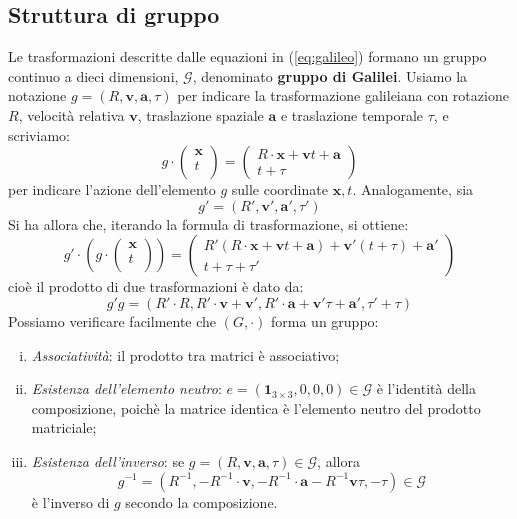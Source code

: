 \documentclass[a4paper,11pt]{book}
\theoremstyle{plain}
\theoremstyle{definition}
\begin{document}
\subsection{Struttura di gruppo}
 Le trasformazioni descritte dalle equazioni in (\ref{eq:galileo}) formano un gruppo continuo a 
dieci dimensioni, $\mathcal{G}$, denominato \textbf{gruppo di Galilei}. Usiamo la notazione $g=(R,\textbf{v},\textbf{a},\tau)$ per indicare la trasformazione galileiana con rotazione $R$, velocità relativa $\textbf{v}$, 
traslazione spaziale $\textbf{a}$ e traslazione temporale $\tau$, e scriviamo:
 \[
 g\cdot
\left (
\begin{array}{c}
 \textbf{x}  \\
 t  \\
\end{array}
\right ) = 
\left( \begin{array}{c}
R\cdot \textbf{x}+\textbf{v}t+\textbf{a} \\
t+\tau
\end{array}\right)
\]
per indicare l'azione dell'elemento $g$ sulle coordinate $\textbf{x}, t$. Analogamente, sia 
\[
g'=(R',\textbf{v}',\textbf{a}',\tau')
\]
Si ha allora che, iterando la formula di trasformazione, si ottiene:
 \[
 g'\cdot \left( g\cdot
\left (
\begin{array}{c}
 \textbf{x}  \\
 t  \\
\end{array}
\right ) \right)= 
\left( \begin{array}{c}
R'(R\cdot \textbf{x}+\textbf{v}t+\textbf{a})+\textbf{v}'(t+\tau)+\textbf{a}' \\
t+\tau+\tau'
\end{array}\right) 
\]
cioè il prodotto di due trasformazioni è dato da:
\[
g'g=(R'\cdot R, R'\cdot \textbf{v}+\textbf{v}',R'\cdot \textbf{a}+\textbf{v}'\tau+\textbf{a}',\tau'+\tau)
\]
Possiamo verificare facilmente che $(G,\cdot)$ forma un gruppo:
\begin{enumerate}[i.]
	\item \emph{Associatività}: il prodotto tra matrici è associativo;
	\item \emph{Esistenza dell'elemento neutro}: $e=(\textbf{1}_{3\times 3},0,0,0)\in \mathcal{G}$ è l'identità della composizione, poichè la matrice identica è l'elemento neutro del prodotto matriciale;
	\item \emph{Esistenza dell'inverso}: se $g=(R,\textbf{v},\textbf{a},\tau) \in \mathcal{G}$, allora 
	\[
	g^{-1}=(R^{-1}, -R^{-1}\cdot \textbf{v}, -R^{-1}\cdot \textbf{a}-R^{-1}\textbf{v}\tau,-\tau)\in \mathcal{G}
	\]
	è l'inverso di $g$ secondo la composizione.
\end{enumerate}
\end{document}
